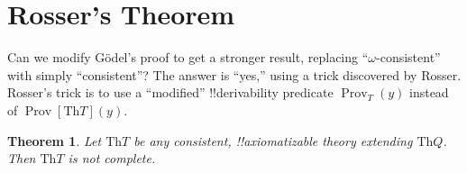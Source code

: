 \documentclass[10pt,a4paper]{article}
\theoremstyle{plain}
\newtheorem{thm}{Theorem}[section]
\theoremstyle{definition}
\theoremstyle{remark}
\newcommand*{\olfileid}[3]{}
\newcommand*{\olsection}[1]{\section*{#1}}
\newcommand*{\ollabel}[1]{\label{#1}}
\providecommand{\Th}{\ensuremath{\mathrm{Th}}}
\providecommand{\OProv}{\operatorname{Prov}}
\providecommand{\ORProv}{\operatorname{Prov}}
\providecommand{\ORProv}{\operatorname{Prov}}
\begin{document}



\olfileid{inc}{inp}{ros}

\olsection{Rosser's Theorem}

Can we modify G\"odel's proof to get a stronger result, replacing
``$\omega$-consistent'' with simply ``consistent''? The answer is
``yes,'' using a trick discovered by Rosser.  Rosser's trick is to use
a ``modified'' !!{derivability} predicate $\ORProv_T(y)$ instead of
$\OProv[\Th{T}](y)$.

\begin{thm}
\ollabel{thm:rosser}
Let $\Th{T}$ be any consistent, !!{axiomatizable} theory
extending $\Th{Q}$. Then $\Th{T}$ is not complete.
\end{thm}
\end{document}
